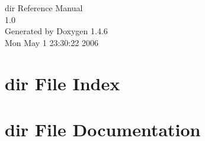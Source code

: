 \documentclass[a4paper]{book}
\begin{document}
\begin{titlepage}
\vspace*{7cm}
\begin{center}
{\Large dir Reference Manual\\[1ex]\large 1.0 }\\
\vspace*{1cm}
{\large Generated by Doxygen 1.4.6}\\
\vspace*{0.5cm}
{\small Mon May 1 23:30:22 2006}\\
\end{center}
\end{titlepage}
\clearemptydoublepage
{}
\tableofcontents
\clearemptydoublepage
{}
\chapter{dir File Index}

\chapter{dir File Documentation}


\printindex
\end{document}

